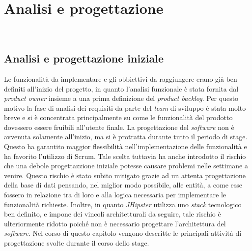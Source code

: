 
\chapter{Analisi e progettazione}
\label{cap:analisi}

\\


\section{Analisi e progettazione iniziale}
Le funzionalità da implementare e gli obbiettivi da raggiungere erano già ben definiti all'inizio del progetto, in quanto l'analisi funzionale è stata fornita dal \textit{product owner} insieme a una prima definizione del \textit{product backlog}.
Per questo motivo la fase di analisi dei requisiti da parte del \textit{team} di sviluppo è stata molto breve e si è concentrata principalmente su come le funzionalità del prodotto dovessero essere fruibili all'utente finale. La progettazione del \textit{software} non è avvenuta solamente all'inizio, ma si è protratta durante tutto il periodo di stage. Questo ha garantito maggior flessibilità nell'implementazione delle funzionalità e ha favorito l'utilizzo di Scrum. Tale scelta tuttavia ha anche introdotto il rischio che una debole progettazzione iniziale potesse causare problemi nelle settimane a venire. Questo rischio è stato subito mitigato grazie ad un attenta progettazione della base di dati pensando, nel miglior modo possibile, alle entità, a come esse fossero in relazione tra di loro e alla logica necessaria per implementare le funzionalità richieste. Inoltre, in quanto \textit{JHipster} utilizza uno \textit{stack} tecnologico ben definito, e impone dei vincoli architetturali da seguire, tale rischio è ulteriormente ridotto poiché non è necessario progettare l'architettura del \textit{software}.
Nel corso di questo capitolo vengono descritte le principali attività di progettazione svolte durante il corso dello stage.

